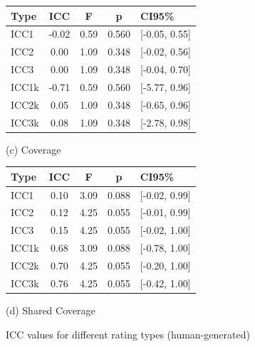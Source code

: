 \begin{figure}[h]
    \vspace{1em}
    \begin{minipage}{.5\textwidth}
        \centering
        \begin{tabular}{lcccl}
            \hline
            \textbf{Type} & \textbf{ICC} & \textbf{F} & \textbf{p} & \textbf{CI95\%} \\
            \hline
            ICC1          & -0.02        & 0.59       & 0.560      & [-0.05, 0.55]   \\
            ICC2          & 0.00         & 1.09       & 0.348      & [-0.02, 0.56]   \\
            ICC3          & 0.00         & 1.09       & 0.348      & [-0.04, 0.70]   \\
            ICC1k         & -0.71        & 0.59       & 0.560      & [-5.77, 0.96]   \\
            ICC2k         & 0.05         & 1.09       & 0.348      & [-0.65, 0.96]   \\
            ICC3k         & 0.08         & 1.09       & 0.348      & [-2.78, 0.98]   \\
            \hline
        \end{tabular}
        \caption*{(c) Coverage}
    \end{minipage}%
    \begin{minipage}{.5\textwidth}
        \centering
        \begin{tabular}{lcccl}
            \hline
            \textbf{Type} & \textbf{ICC} & \textbf{F} & \textbf{p} & \textbf{CI95\%} \\
            \hline
            ICC1          & 0.10         & 3.09       & 0.088      & [-0.02, 0.99]   \\
            ICC2          & 0.12         & 4.25       & 0.055      & [-0.01, 0.99]   \\
            ICC3          & 0.15         & 4.25       & 0.055      & [-0.02, 1.00]   \\
            ICC1k         & 0.68         & 3.09       & 0.088      & [-0.78, 1.00]   \\
            ICC2k         & 0.70         & 4.25       & 0.055      & [-0.20, 1.00]   \\
            ICC3k         & 0.76         & 4.25       & 0.055      & [-0.42, 1.00]   \\
            \hline
        \end{tabular}
        \caption*{(d) Shared Coverage}
    \end{minipage}
    \caption{ICC values for different rating types (human-generated)}
    \label{fig:icc_human}
\end{figure}

